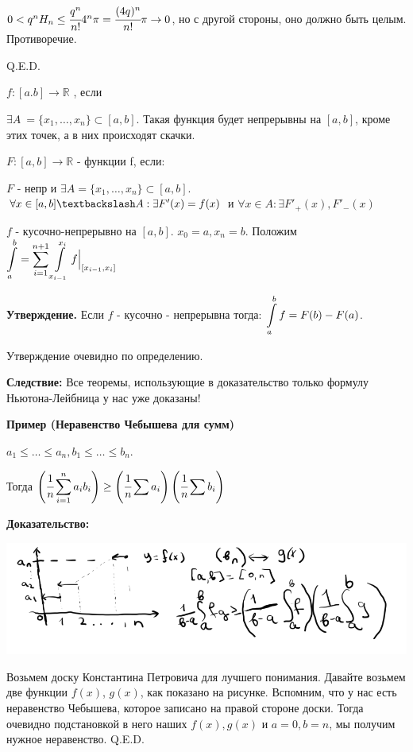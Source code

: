 $0<q^nH_n \leq \cfrac{q^n}{n!}4^n\pi=\cfrac{(4q)^n}{n!}\pi\rightarrow 0$, но с другой стороны, оно должно быть целым. Противоречие.

\hfill Q.E.D.

 $f:[a.b] \rightarrow \mathbb{R}$ , если

$\exists A \ = \{x_1,\ldots,x_n\} \subset [a,b]$. Такая функция будет непрерывны на $[a,b]$, кроме этих точек, а в них происходят скачки.


 $F:[a,b] \rightarrow \mathbb{R}$ -  функции f, если:

$F$ - непр и $\exists A = \{x_1,\ldots,x_n\} \subset[a,b]$.
$\forall x \in [a,b] \textbackslash A: \exists F'(x) = f(x)$ и $\forall x \in A: \exists F'_+(x),F'_-(x)$


$f$ - кусочно-непрерывно на $[a,b]$. $x_0 = a, x_n = b$. Положим $\displaystyle\int\limits_{a}^{b} = \sum\limits_{i=1}^{n+1}\displaystyle\int\limits_{x_{i-1}}^{x_i}f\Big|_{[x_{i-1},x_i]}$

\textbf{Утверждение.} Если $f$ - кусочно - непрерывна тогда: $\displaystyle\int\limits_{a}^{b}f=F(b)-F(a)$.

Утверждение очевидно по определению.

\textbf{Следствие:} Все теоремы, использующие в доказательство только формулу Ньютона-Лейбница у нас уже доказаны!

\textbf{Пример (Неравенство Чебышева для сумм)}

$a_1\leq \ldots \leq a_n, b_1\leq \ldots \leq b_n$.

Тогда $\displaystyle\left(\cfrac{1}{n} \sum\limits_{i=1}^na_ib_i\right)\geq \left( \cfrac{1}{n}\sum a_i\right)\left(\cfrac{1}{n}\sum b_i\right)$

\textbf{Доказательство:}
\begin{center}
   \includegraphics[width = 19 cm]{assets/integral_2.png}
\end{center}
Возьмем доску Константина Петровича для лучшего понимания. Давайте возьмем две функции $f(x)$, $g(x)$, как показано на рисунке. Вспомним, что у нас есть неравенство Чебышева, которое записано на правой стороне доски. Тогда очевидно подстановкой в него наших $f(x),g(x)$ и $a=0,b=n$, мы получим нужное неравенство.
\hfill Q.E.D.

